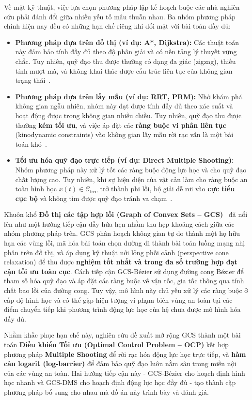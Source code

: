 Về mặt kỹ thuật, việc lựa chọn phương pháp lập kế hoạch buộc các nhà nghiên cứu phải đánh đổi giữa nhiều yếu tố mâu thuẫn nhau. Ba nhóm phương pháp chính hiện nay đều có những hạn chế riêng khi đối mặt với bài toán đầy đủ:

\begin{itemize}

\item \textbf{Phương pháp dựa trên đồ thị (ví dụ: A*, Dijkstra):} Các thuật toán này đảm bảo tính đầy đủ theo độ phân giải và có nền tảng lý thuyết vững chắc. Tuy nhiên, quỹ đạo thu được thường có dạng đa giác (zigzag), thiếu tính mượt mà, và không khai thác được cấu trúc liên tục của không gian trạng thái~\cite{LaValle2006}.

\item \textbf{Phương pháp dựa trên lấy mẫu (ví dụ: RRT, PRM):} Nhờ khám phá không gian ngẫu nhiên, nhóm này đạt được tính đầy đủ theo xác suất và hoạt động được trong không gian nhiều chiều. Tuy nhiên, quỹ đạo thu được thường \textbf{kém tối ưu}, và việc áp đặt các \textbf{ràng buộc vi phân liên tục} (kinodynamic constraints) vào không gian lấy mẫu rời rạc vẫn là một bài toán khó~\cite{KavrakiEtAl1996}.

\item \textbf{Tối ưu hóa quỹ đạo trực tiếp (ví dụ: Direct Multiple Shooting):} Nhóm phương pháp này xử lý tốt các ràng buộc động lực học và cho quỹ đạo chất lượng cao. Tuy nhiên, khi sự hiện diện của vật cản làm cho ràng buộc an toàn hình học $x(t) \in \mathcal{C}_{\mathrm{free}}$ trở thành phi lồi, bộ giải dễ rơi vào \textbf{cực tiểu cục bộ} và không tìm được quỹ đạo tránh va chạm~\cite{DiehlEtAl2006}.

\end{itemize}

Khuôn khổ \textbf{Đồ thị các tập hợp lồi (Graph of Convex Sets -- GCS)}~\cite{MarcucciEtAl2023GCS} đã nổi lên như một hướng tiếp cận đầy hứa hẹn nhằm thu hẹp khoảng cách giữa các nhóm phương pháp trên.
GCS phân hoạch không gian tự do thành một họ hữu hạn các vùng lồi, mã hóa bài toán chọn đường đi thành bài toán luồng mạng nhị phân trên đồ thị, và áp dụng kỹ thuật nới lỏng phối cảnh (perspective cone relaxation) để thu được \textbf{nghiệm tốt nhất và trong đa số trường hợp đạt cận tối ưu toàn cục}.
Cách tiếp cận GCS-Bézier sử dụng đường cong Bézier để tham số hóa quỹ đạo và áp đặt các ràng buộc về vận tốc, gia tốc thông qua tính chất bao lồi của đường cong.
Tuy vậy, mô hình này chủ yếu xử lý các ràng buộc ở cấp độ hình học và có thể gặp hiện tượng vi phạm biên vùng an toàn tại các điểm chuyển tiếp khi phương trình động lực học của hệ chưa được mô hình hóa đầy đủ.

Nhằm khắc phục hạn chế này, nghiên cứu đề xuất mở rộng GCS thành một bài toán \textbf{Điều khiển Tối ưu (Optimal Control Problem -- OCP)} kết hợp phương pháp \textbf{Multiple Shooting} để rời rạc hóa động lực học trực tiếp, và \textbf{hàm cản logarit (log-barrier)} để đảm bảo quỹ đạo luôn nằm sâu trong miền nội của các vùng an toàn.
Hai hướng tiếp cận này - GCS-Bézier cho hoạch định hình học nhanh và GCS-DMS cho hoạch định động lực học đầy đủ - tạo thành cặp phương pháp bổ sung cho nhau mà đồ án này trình bày và đánh giá.